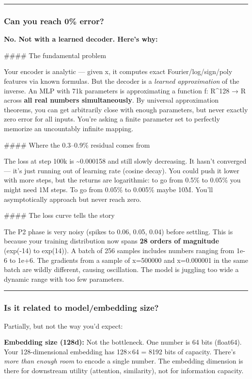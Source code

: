 \documentclass[11pt]{article}
\begin{document}
\noindent\rule{\textwidth}{0.4pt}


\subsubsection*{Can you reach 0\% error?}


\textbf{No. Not with a learned decoder. Here's why:}


\#\#\#\# The fundamental problem


Your encoder is analytic — given x, it computes exact Fourier/log/sign/poly features via known formulas. But the decoder is a \emph{learned approximation} of the inverse. An MLP with 71k parameters is approximating a function f: R\textasciicircum{}128 → R across \textbf{all real numbers simultaneously}. By universal approximation theorems, you can get arbitrarily close with enough parameters, but never exactly zero error for all inputs. You're asking a finite parameter set to perfectly memorize an uncountably infinite mapping.


\#\#\#\# Where the 0.3–0.9\% residual comes from


The loss at step 100k is \textasciitilde{}0.000158 and still slowly decreasing. It hasn't converged — it's just running out of learning rate (cosine decay). You could push it lower with more steps, but the returns are logarithmic: to go from 0.5\% to 0.05\% you might need 1M steps. To go from 0.05\% to 0.005\% maybe 10M. You'll asymptotically approach but never reach zero.


\#\#\#\# The loss curve tells the story


The P2 phase is very noisy (spikes to 0.06, 0.05, 0.04) before settling. This is because your training distribution now spans \textbf{28 orders of magnitude} (exp(-14) to exp(14)). A batch of 256 samples includes numbers ranging from 1e-6 to 1e+6. The gradients from a sample of x=500000 and x=0.000001 in the same batch are wildly different, causing oscillation. The model is juggling too wide a dynamic range with too few parameters.


\noindent\rule{\textwidth}{0.4pt}


\subsubsection*{Is it related to model/embedding size?}


Partially, but not the way you'd expect:


\textbf{Embedding size (128d):} Not the bottleneck. One number is 64 bits (float64). Your 128-dimensional embedding has 128×64 = 8192 bits of capacity. There's \emph{more than enough room} to encode a single number. The embedding dimension is there for downstream utility (attention, similarity), not for information capacity.
\end{document}

